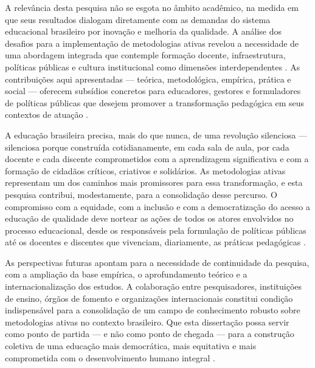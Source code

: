 A relevância desta pesquisa não se esgota no âmbito acadêmico, na medida em que seus resultados dialogam diretamente com as demandas do sistema educacional brasileiro por inovação e melhoria da qualidade. A análise dos desafios para a implementação de metodologias ativas revelou a necessidade de uma abordagem integrada que contemple formação docente, infraestrutura, políticas públicas e cultura institucional como dimensões interdependentes \cite{VEIGA2014}. As contribuições aqui apresentadas — teórica, metodológica, empírica, prática e social — oferecem subsídios concretos para educadores, gestores e formuladores de políticas públicas que desejem promover a transformação pedagógica em seus contextos de atuação \cite{LIBANEO2006}.

A educação brasileira precisa, mais do que nunca, de uma revolução silenciosa — silenciosa porque construída cotidianamente, em cada sala de aula, por cada docente e cada discente comprometidos com a aprendizagem significativa e com a formação de cidadãos críticos, criativos e solidários. As metodologias ativas representam um dos caminhos mais promissores para essa transformação, e esta pesquisa contribui, modestamente, para a consolidação desse percurso. O compromisso com a equidade, com a inclusão e com a democratização do acesso a educação de qualidade deve nortear as ações de todos os atores envolvidos no processo educacional, desde os responsáveis pela formulação de políticas públicas até os docentes e discentes que vivenciam, diariamente, as práticas pedagógicas \cite{SOUSA2025}.

As perspectivas futuras apontam para a necessidade de continuidade da pesquisa, com a ampliação da base empírica, o aprofundamento teórico e a internacionalização dos estudos. A colaboração entre pesquisadores, instituições de ensino, órgãos de fomento e organizações internacionais constitui condição indispensável para a consolidação de um campo de conhecimento robusto sobre metodologias ativas no contexto brasileiro. Que esta dissertação possa servir como ponto de partida — e não como ponto de chegada — para a construção coletiva de uma educação mais democrática, mais equitativa e mais comprometida com o desenvolvimento humano integral \cite{TEODORO2024}.

